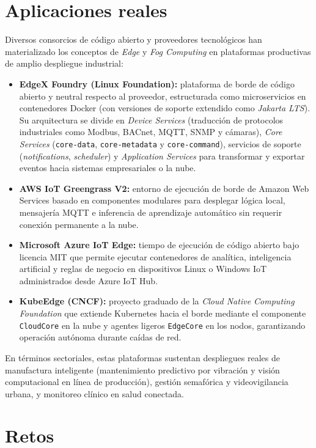 \documentclass[12pt, letterpaper]{article}
\begin{document}
\section{Aplicaciones reales}

Diversos consorcios de código abierto y proveedores tecnológicos han materializado los conceptos de \textit{Edge} y \textit{Fog Computing} en plataformas productivas de amplio despliegue industrial:

\begin{itemize}
    \item \textbf{EdgeX Foundry (Linux Foundation):} plataforma de borde de código abierto y neutral respecto al proveedor, estructurada como microservicios en contenedores Docker (con versiones de soporte extendido como \textit{Jakarta LTS}). Su arquitectura se divide en \textit{Device Services} (traducción de protocolos industriales como Modbus, BACnet, MQTT, SNMP y cámaras), \textit{Core Services} (\texttt{core-data}, \texttt{core-metadata} y \texttt{core-command}), servicios de soporte (\textit{notifications}, \textit{scheduler}) y \textit{Application Services} para transformar y exportar eventos hacia sistemas empresariales o la nube.
    \item \textbf{AWS IoT Greengrass V2:} entorno de ejecución de borde de Amazon Web Services basado en componentes modulares para desplegar lógica local, mensajería MQTT e inferencia de aprendizaje automático sin requerir conexión permanente a la nube.
    \item \textbf{Microsoft Azure IoT Edge:} tiempo de ejecución de código abierto bajo licencia MIT que permite ejecutar contenedores de analítica, inteligencia artificial y reglas de negocio en dispositivos Linux o Windows IoT administrados desde Azure IoT Hub.
    \item \textbf{KubeEdge (CNCF):} proyecto graduado de la \textit{Cloud Native Computing Foundation} que extiende Kubernetes hacia el borde mediante el componente \texttt{CloudCore} en la nube y agentes ligeros \texttt{EdgeCore} en los nodos, garantizando operación autónoma durante caídas de red.
\end{itemize}

En términos sectoriales, estas plataformas sustentan despliegues reales de manufactura inteligente (mantenimiento predictivo por vibración y visión computacional en línea de producción), gestión semafórica y videovigilancia urbana, y monitoreo clínico en salud conectada.

\section{Retos}
\end{document}
